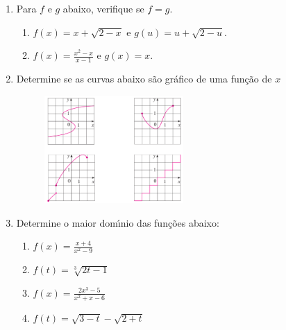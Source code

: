 \documentclass[a4paper,5pt]{amsbook}
\begin{document}
\vspace{1cm}
\begin{enumerate}
    \vspace{0.5cm}
    \item Para $f$ e $g$ abaixo, verifique se $f=g$.
        \begin{enumerate}
            \vspace{0.3cm}
            \item $f(x)=x+\sqrt{2-x}$ e $g(u)=u+\sqrt{2-u}$.
            \vspace{0.3cm}
            \item $f(x)=\displaystyle \frac{x^2-x}{x-1}$ e $g(x)=x$.
        \end{enumerate}

    \vspace{0.5cm}
    \item Determine se as curvas abaixo s\~ao gr\'afico de uma fun\c{c}\~ao de $x$
        \begin{figure}[h]
            \centering
            \includegraphics[width=0.5\textwidth]{lista-03-fig1.png}
        \end{figure}

    \vspace{0.5cm}
    \item Determine o maior dom\'{\i}nio das fun\c{c}\~oes abaixo:
        \begin{enumerate}
            \vspace{0.3cm}
            \item $\displaystyle f(x)=\frac{x+4}{x^2-9}$
            \vspace{0.3cm}
            \item $f(t)=\sqrt[3]{2t-1}$
            \vspace{0.3cm}
            \item $f(x)=\displaystyle\frac{2x^3-5}{x^2+x-6}$
            \vspace{0.3cm}
            \item $f(t)=\sqrt{3-t}-\sqrt{2+t}$
        \end{enumerate}


\end{enumerate}
\end{document}
